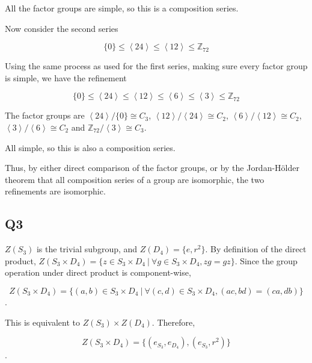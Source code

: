 \documentclass{amsart}
\begin{document}
    All the factor groups are simple, so this is a composition series.

    Now consider the second series 

    \[
        \{0\} \leq \left\langle 24 \right\rangle \leq \left\langle 12 \right\rangle \leq \mathbb{Z}_{72}
    \]

    Using the same process as used for the first series, making sure every factor group is simple, we have the refinement

    \[
        \{0\} \leq \left\langle 24 \right\rangle \leq \left\langle 12 \right\rangle \leq \left\langle 6 \right\rangle \leq \left\langle 3 \right\rangle \leq \mathbb{Z}_{72}
    \]

    The factor groups are $\left\langle 24 \right\rangle / \{0\} \cong C_3$, $\left\langle 12 \right\rangle / \left\langle 24 \right\rangle \cong C_2$, $\left\langle 6 \right\rangle / \left\langle 12 \right\rangle \cong C_2$, \break $\left\langle 3 \right\rangle / \left\langle 6 \right\rangle \cong C_2$ and $\mathbb{Z}_{72} / \left\langle 3 \right\rangle \cong C_3$.

    All simple, so this is also a composition series.

    Thus, by either direct comparison of the factor groups, or by the Jordan-H{\"o}lder theorem that all composition series of a group are isomorphic, the two refinements are isomorphic.

    \subsection*{Q3}

    $Z(S_3)$ is the trivial subgroup, and $Z(D_4) = \{e, r^2\}$. By definition of the direct product, $Z(S_3 \times D_4) = \{z \in S_3 \times D_4 \ | \ \forall g \in S_3 \times D_4, zg = gz\}$. Since the group operation under direct product is component-wise, 

    \[Z(S_3 \times D_4) = \{(a, b) \in S_3 \times D_4 \ | \ \forall (c, d) \in S_3 \times D_4, (ac, bd) = (ca, db)\}\].

    This is equivalent to $Z(S_3) \times Z(D_4)$. Therefore, 

    \[Z(S_3 \times D_4) = \{(e_{S_3}, e_{D_4}), (e_{S_3}, r^2)\}\].
\end{document}

